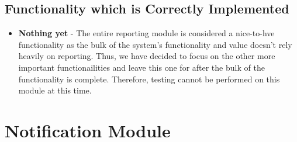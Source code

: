 \documentclass[11pt,fleqn]{book} %
\begin{document}
		\subsection{Functionality which is Correctly Implemented}
			\begin{itemize}
				\item\textbf{Nothing yet} -
				The entire reporting module is considered a nice-to-hve functionality as the bulk of the system's functionality and value doesn't rely heavily on reporting. Thus, we have decided to focus on the other more important functionailities and leave this one for after the bulk of the functionality is complete. Therefore, testing cannot be performed on this module at this time.
			\end{itemize}
%				
%				
%				
			
	\section{Notification Module}
\end{document}
